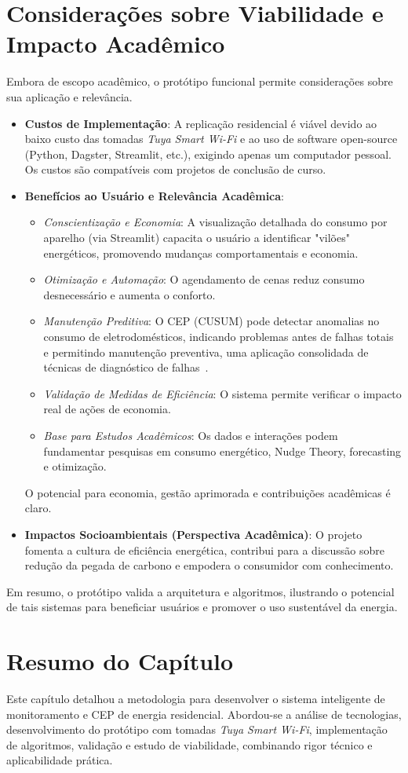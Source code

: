 \section{Considerações sobre Viabilidade e Impacto Acadêmico}
\label{sec:viabilidade_impacto}
Embora de escopo acadêmico, o protótipo funcional permite considerações sobre sua aplicação e relevância.
\begin{itemize}
    \item \textbf{Custos de Implementação}: A replicação residencial é viável devido ao baixo custo das tomadas \textit{Tuya Smart Wi-Fi} e ao uso de software open-source (Python, Dagster, Streamlit, etc.), exigindo apenas um computador pessoal. Os custos são compatíveis com projetos de conclusão de curso.
    \item \textbf{Benefícios ao Usuário e Relevância Acadêmica}:
    \begin{itemize}
        \item \textit{Conscientização e Economia}: A visualização detalhada do consumo por aparelho (via Streamlit) capacita o usuário a identificar "vilões" energéticos, promovendo mudanças comportamentais e economia.
        \item \textit{Otimização e Automação}: O agendamento de cenas reduz consumo desnecessário e aumenta o conforto.
        \item \textit{Manutenção Preditiva}: O CEP (CUSUM) pode detectar anomalias no consumo de eletrodomésticos, indicando problemas antes de falhas totais e permitindo manutenção preventiva, uma aplicação consolidada de técnicas de diagnóstico de falhas~\cite{Gao2015SPCPredictive}.
        \item \textit{Validação de Medidas de Eficiência}: O sistema permite verificar o impacto real de ações de economia.
        \item \textit{Base para Estudos Acadêmicos}: Os dados e interações podem fundamentar pesquisas em consumo energético, Nudge Theory, forecasting e otimização.
    \end{itemize}
    O potencial para economia, gestão aprimorada e contribuições acadêmicas é claro.
    \item \textbf{Impactos Socioambientais (Perspectiva Acadêmica)}: O projeto fomenta a cultura de eficiência energética, contribui para a discussão sobre redução da pegada de carbono e empodera o consumidor com conhecimento.
\end{itemize}
Em resumo, o protótipo valida a arquitetura e algoritmos, ilustrando o potencial de tais sistemas para beneficiar usuários e promover o uso sustentável da energia.


\section{Resumo do Capítulo}
Este capítulo detalhou a metodologia para desenvolver o sistema inteligente de monitoramento e CEP de energia residencial. Abordou-se a análise de tecnologias, desenvolvimento do protótipo com tomadas \textit{Tuya Smart Wi-Fi}, implementação de algoritmos, validação e estudo de viabilidade, combinando rigor técnico e aplicabilidade prática.
